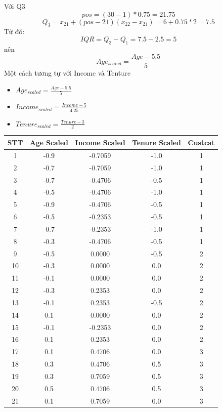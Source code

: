 \documentclass[12pt,a4paper]{article}
\begin{document}
Với Q3
\[
pos=(30-1)*0.75=21.75
\] 
\[
Q_3=x_{21}+(pos-21)(x_{22}-x_{21})=6+0.75*2=7.5
\]
Từ đó:
\[
IQR=Q_3-Q_1=7.5-2.5=5
\] 
nên
\[
Age_{scaled}=\frac{Age-5.5}{5}
\]
Một cách tương tự với Income và Tenture
\begin{itemize}
    \item $Age_{scaled} = \frac{Age - 5.5}{5}$
    \item $Income_{scaled} = \frac{Income - 5}{4.25}$
    \item $Tenure_{scaled} = \frac{Tenure - 3}{2}$
\end{itemize}
\begin{table}[h]
\centering

\begin{tabular}{|c|c|c|c|c|}
\hline
\textbf{STT} & \textbf{Age Scaled} & \textbf{Income Scaled} & \textbf{Tenure Scaled} & \textbf{Custcat} \\ \hline
1  & -0.9 & -0.7059 & -1.0 & 1 \\ \hline
2  & -0.7 & -0.7059 & -1.0 & 1 \\ \hline
3  & -0.7 & -0.4706 & -0.5 & 1 \\ \hline
4  & -0.5 & -0.4706 & -1.0 & 1 \\ \hline
5  & -0.9 & -0.4706 & -0.5 & 1 \\ \hline
6  & -0.5 & -0.2353 & -0.5 & 1 \\ \hline
7  & -0.7 & -0.2353 & -1.0 & 1 \\ \hline
8  & -0.3 & -0.4706 & -0.5 & 1 \\ \hline
9  & -0.5 & 0.0000  & -0.5 & 2 \\ \hline
10 & -0.3 & 0.0000  & 0.0  & 2 \\ \hline
11 & -0.1 & 0.0000  & 0.0  & 2 \\ \hline
12 & -0.3 & 0.2353  & 0.0  & 2 \\ \hline
13 & -0.1 & 0.2353  & -0.5 & 2 \\ \hline
14 & 0.1  & 0.0000  & 0.0  & 2 \\ \hline
15 & -0.1 & -0.2353 & 0.0  & 2 \\ \hline
16 & 0.1  & 0.2353  & 0.0  & 2 \\ \hline
17 & 0.1  & 0.4706  & 0.0  & 3 \\ \hline
18 & 0.3  & 0.4706  & 0.5  & 3 \\ \hline
19 & 0.3  & 0.7059  & 0.5  & 3 \\ \hline
20 & 0.5  & 0.4706  & 0.5  & 3 \\ \hline
21 & 0.1  & 0.7059  & 0.0  & 3 \\ \hline

\end{tabular}
\end{table}
\end{document}
